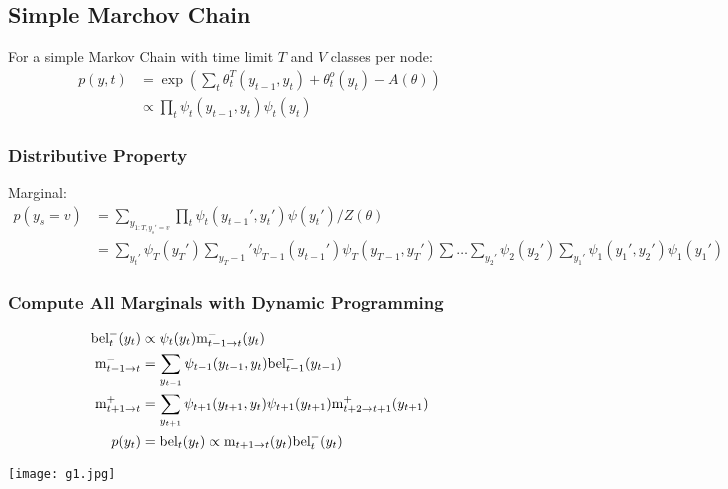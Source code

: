 \documentclass{article}
\begin{document}

\subsection{Simple Marchov Chain}
For a simple Markov Chain with time limit $T$ and $V$ classes per node:
\begin{align*}
p(y,t) &=\exp(\sum_{t}\theta_t^T(y_{t-1},y_t) + \theta_t^o(y_t)-A(\theta))\\
&\propto \prod_{t} \psi_t(y_{t-1},y_t) \psi_t(y_t)
\end{align*}
\begin{center}
\end{center}

\subsubsection{Distributive Property}
Marginal:
\begin{align*}
p(y_s=v) &= \sum_{y_{1:T,y_s' =v}}\prod_{t}\psi_t(y_{t-1}',y_t')\psi(y_t')/Z(\theta)\\
&=\sum_{y_t'}\psi_T(y_T')\sum_{y_T-1}'\psi_{T-1}(y_{t-1}')\psi_T(y_{T-1},y_T') \sum \ldots \sum_{y_2'} \psi_2(y_2')\sum_{y_1'}\psi_1(y_1',y_2')\psi_1(y_1')
\end{align*}
\subsubsection{Compute All Marginals with Dynamic Programming}
\begin{align*}
\text{bel}_t^-(y_t) &\propto \psi_t(y_t) \text{m}_{t-1 \rightarrow t}^-(y_t)\\
\text{m}_{t-1\rightarrow t}^- &=\sum_{y_{t-1}}\psi_{t-1}(y_{t-1},y_t)\text{bel}_{t-1}^-(y_{t-1})\\
\text{m}_{t+1\rightarrow t}^+ &= \sum_{y_{t+1}}\psi_{t+1}(y_{t+1},y_t)\psi_{t+1}(y_{t+1})\text{m}_{t+2\rightarrow t+1}^+(y_{t+1})\\
p(y_t)&=\text{bel}_t(y_t)\propto \text{m}_{t+1\rightarrow t}(y_t)\text{bel}_t^-(y_t)
\end{align*}
\begin{center}
\texttt{[image: g1.jpg]}
\end{center}
\end{document}
